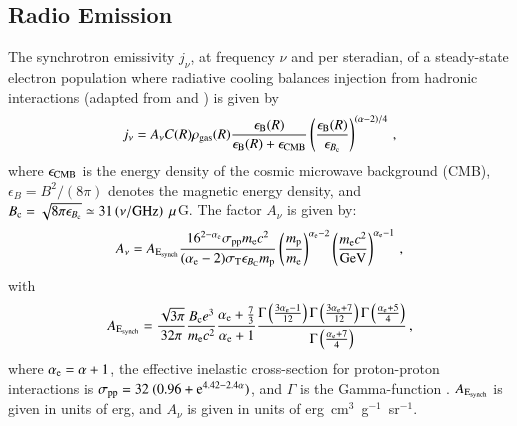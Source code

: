 \documentclass[useAMS,usenatbib]{mn2e}
\begin{document}
\begin{appendix}

\section{Radio Emission}
\label{app:A}

The synchrotron emissivity $j_{\nu}$, at frequency $\nu$ and per
steradian, of a steady-state electron population where radiative cooling
balances injection from hadronic interactions (adapted from
\citealp{2008MNRAS.385.1211P} and \citealp{2011A&A...527A..99E})
is given by
%
\begin{equation}
j_{\nu}  =  A_\nu C(R) \rho_{{\mathrm{gas}}}(R) 
\frac{\epsilon_{{\mathrm{B}}}(R)}{\epsilon_{{\mathrm{B}}}(R)+\epsilon_{{\mathrm{CMB}}}} 
\left( \frac{\epsilon_{{\mathrm{B}}}(R)}{\epsilon_{B_{{\mathrm{c}}}}} \right)^{(\alpha-2)/4} \, ,
\label{eq:jnu}
\end{equation}
%
where $\epsilon_{{\mathrm{CMB}}}$ is the energy density of the cosmic microwave 
background (CMB), $\epsilon_B=B^{2}/(8\pi)$ denotes the magnetic
energy density, and $B_{{\mathrm{c}}} = \sqrt{ 8 \pi
  \epsilon_{B_{{\mathrm{c}}}}} \simeq 31 \left( \nu/{\mathrm{GHz}} \right)~\mu$G. 
%
The factor $A_{\nu}$ is given by: 
%
\begin{equation}
A_{\nu} = A_{{\mathrm{E_{synch}}}} \frac{16^{2-\alpha_{{\mathrm{e}}}}\sigma_{{\mathrm{pp}}}m_{{\mathrm{e}}}c^{2}}{(\alpha_{{\mathrm{e}}}-2)\sigma_{{\mathrm{T}}}\epsilon_{B_{{\mathrm{C}}}}m_{{\mathrm{p}}}}\left(\frac{m_{{\mathrm{p}}}
}{m_{{\mathrm{e}}}}\right)^{\alpha_{{\mathrm{e}}}-2} \left(\frac{m_{{\mathrm{e}}}c^{2}}{{\mathrm{GeV}}}\right)^{\alpha_{{\mathrm{e}}}-1} \, ,
\end{equation}
%
with
%
\begin{equation}
A_{{\mathrm{E_{synch}}}} = \frac{\sqrt{3\pi}}{32\pi}\frac{B_{{\mathrm{c}}}e^{3}}{m_{{\mathrm{e}}}c^{2}}\frac{\alpha_{{\mathrm{e}}}+\frac{7}{3}}{\alpha_{{\mathrm{e}}}+1}\frac{\Gamma\left(\frac{3\alpha_{{\mathrm{e}}}-1}{12}\right)\Gamma\left(\frac{3\alpha_{{\mathrm{e}}}+7}{12}\right)\Gamma\left(\frac{\alpha_{{\mathrm{e}}}+5}{4}\right)}{\Gamma\left(\frac{\alpha_{{\mathrm{e}}}+7}{4}\right)} \, ,
\end{equation}
%
where $\alpha_{{\mathrm{e}}}=\alpha+1$, the effective inelastic cross-section for
proton-proton interactions is $\sigma_{{\mathrm{pp}}} =
32~(0.96+{\mathrm{e}}^{4.42-2.4\alpha})$, and
$\Gamma$ is the Gamma-function
\citep{1965hmfw.book.....A}. $A_{{\mathrm{E_{synch}}}}$ is given in units of erg, and
$A_{\nu}$ is given in units of erg~cm$^{3}$~g$^{-1}$~sr$^{-1}$.


\end{appendix}
\end{document}
